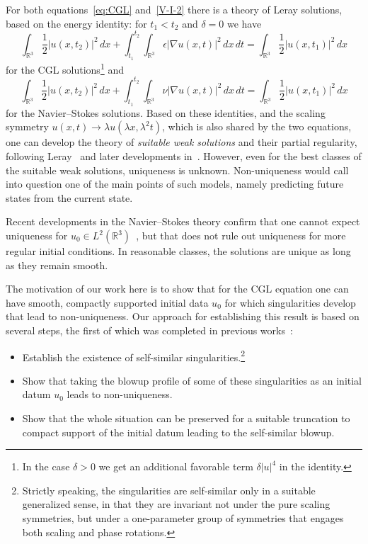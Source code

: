 \documentclass[11pt]{article}
\newcommand{\RR}{\mathbb R}
\begin{document}
For both equations~\eqref{eq:CGL} and~\eqref{V-I-2} there is a theory
of Leray solutions, based on the energy identity: for \(t_1<t_2\) and
\(\delta=0\) we have
\begin{equation*}
  \int_{\RR^{3}} \frac{1}{2}|u(x,t_2)|^{2}\,dx+\int_{t_1}^{t_2}\int_{\RR^{3}} \epsilon|\nabla u(x,t)|^{2}\,dx\,dt=\int_{\RR^{3}}\frac{1}{2}|u(x,t_1)|^{2}\,dx
\end{equation*}
for the CGL solutions\footnote{In the case \(\delta>0\) we get an
  additional favorable term \(\delta|u|^{4}\) in the identity.} and
\begin{equation*}
  \int_{\RR^{3}} \frac{1}{2}|u(x,t_2)|^{2}\,dx+\int_{t_1}^{t_2}\int_{\RR^{3}} \nu|\nabla u(x,t)|^{2}\,dx\,dt=\int_{\RR^{3}}\frac{1}{2}|u(x,t_1)|^{2}\,dx
\end{equation*}
for the Navier--Stokes solutions. Based on these identities, and the
scaling symmetry \(u(x,t)\to\lambda u(\lambda x,\lambda^{2}t)\), which
is also shared by the two equations, one can develop the theory of
\emph{suitable weak solutions} and their partial regularity, following
Leray~\cite{Leray1934} and later developments in~\cite{Doering1994,
  Scheffer1977, Caffarelli1982, Yan1999}. However, even for the best
classes of the suitable weak solutions, uniqueness is unknown.
Non-uniqueness would call into question one of the main points of such
models, namely predicting future states from the current state.

Recent developments in the Navier--Stokes theory confirm that one
cannot expect uniqueness for \(u_0\in L^{2}(\RR^{3})\)~\cite{Jia2015,
  Guillod2023, Albritton2022, Hou2025}, but that does not rule out
uniqueness for more regular initial conditions. In reasonable classes,
the solutions are unique as long as they remain smooth.

The motivation of our work here is to show that for the CGL equation
one can have smooth, compactly supported initial data \(u_0\) for
which singularities develop that lead to non-uniqueness. Our approach
for establishing this result is based on several steps, the first of
which was completed in previous works~\cite{Plech2001, Dahne2024}:

\begin{itemize}
\item[(i)] Establish the existence of self-similar
  singularities.\footnote{Strictly speaking, the singularities are
    self-similar only in a suitable generalized sense, in that they
    are invariant not under the pure scaling symmetries, but under a
    one-parameter group of symmetries that engages both scaling and
    phase rotations.}
\item[(ii)] Show that taking the blowup profile of some of these
  singularities as an initial datum \(u_0\) leads to non-uniqueness.
\item[(iii)] Show that the whole situation can be preserved for a
  suitable truncation to compact support of the initial datum leading
  to the self-similar blowup.
\end{itemize}
\end{document}

